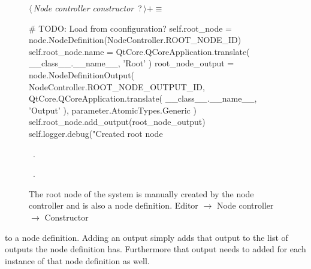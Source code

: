 \documentclass[%
    a4paper,    %
    justified,  %
    nobib,      %
    openany     %
]{tufte-book}
\begin{document}
\begin{figure}
\begin{flushleft} \small
\begin{minipage}{\linewidth}\label{scrap142}\raggedright\small
{} $\langle\,${\itshape Node controller constructor}\nobreak\ {\footnotesize {?}}$\,\rangle+\equiv$
\vspace{-1ex}
\begin{pythoncode}
    # TODO: Load from coonfiguration?
    self.root_node = node.NodeDefinition(NodeController.ROOT_NODE_ID)
    self.root_node.name = QtCore.QCoreApplication.translate(
        __class__.__name__,
        'Root'
    )
    root_node_output = node.NodeDefinitionOutput(
        NodeController.ROOT_NODE_OUTPUT_ID,
        QtCore.QCoreApplication.translate(
            __class__.__name__,
            'Output'
        ),
        parameter.AtomicTypes.Generic
    )
    self.root_node.add_output(root_node_output)
    self.logger.debug("Created root node %
\end{pythoncode}
\vspace{1.5ex}
\footnotesize
\begin{list}{}{\setlength{\itemsep}{-\parsep}\setlength{\itemindent}{-\leftmargin}}
\item \NWtxtMacroDefBy\ .
\item \NWtxtMacroRefIn\ .

\item{}
\end{list}
\end{minipage}\vspace{4ex}
\end{flushleft}
\caption{The root node of the system is manually created by the node controller
  and is also a node definition.
  \newline{}\newline{}Editor $\rightarrow$ Node controller $\rightarrow$
  Constructor}
\label{editor:lst:node-controller:constructor:add-root-node}
\end{figure}

 to a node
definition. Adding an output simply adds that output to the list of outputs the
node definition has. Furthermore that output needs to added for each instance of
that node definition as well. 
\end{document}
